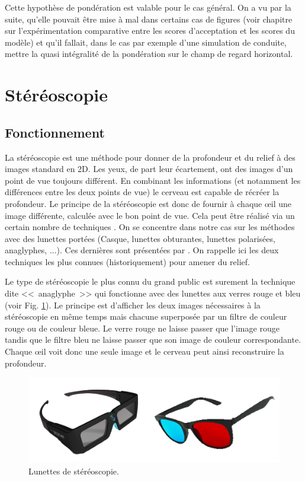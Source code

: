	\par Cette hypothèse de pondération est valable pour le cas général. On a vu par la suite, qu'elle pouvait être mise à mal dans certains cas de figures (voir chapitre sur l'expérimentation comparative entre les scores d'acceptation et les scores du modèle) et qu'il fallait, dans le cas par exemple d'une simulation de conduite, mettre la quasi intégralité de la pondération sur le champ de regard horizontal.
	
	\section{Stéréoscopie}
	\subsection{Fonctionnement}	
	\par La stéréoscopie est une méthode pour donner de la profondeur et du relief à des images  standard en 2D. Les yeux, de part leur écartement, ont des images d'un point de vue toujours différent. En combinant les informations (et notamment les différences entre les deux points de vue) le cerveau est capable de récréer la profondeur. Le principe de la stéréoscopie est donc de fournir à chaque œil une image différente, calculée avec le bon point de vue. Cela peut être réalisé via un certain nombre de techniques \citep{mehrabi_making_2013}. On se concentre dans notre cas sur les méthodes avec des lunettes portées (Casque, lunettes obturantes, lunettes polarisées, anaglyphes, ...). Ces dernières sont présentées par \cite{fauster_stereoscopic_2007}. On rappelle ici les deux techniques les plus connues (historiquement) pour amener du relief.
	
	\par Le type de stéréoscopie le plus connu du grand public est surement la technique dite <<~anaglyphe~>> qui fonctionne avec des lunettes aux verres rouge et bleu (voir Fig. \ref{fig:stereo_glasses}). Le principe est d'afficher les deux images nécessaires à la stéréoscopie en même temps mais chacune superposée par un filtre de couleur rouge ou de couleur bleue. Le verre rouge ne laisse passer que l'image rouge tandis que le filtre bleu ne laisse passer que son image de couleur correspondante. Chaque œil voit donc une seule image et le cerveau peut ainsi reconstruire la profondeur.
	
	\begin{figure}
		\centering
		\includegraphics[scale=.8]{Figures/StereoActiveAnaglyphGlasses}
		\caption{Lunettes de stéréoscopie.}
		\label{fig:stereo_glasses}
	\end{figure}
	
